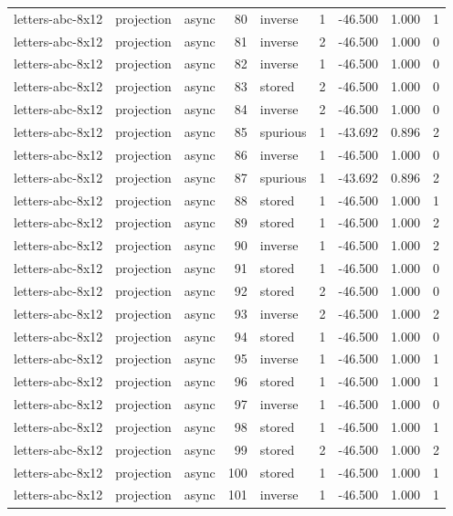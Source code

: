 \begin{tabular}{lllrlrrrr}
letters-abc-8x12 & projection & async & 80 & inverse & 1 & -46.500 & 1.000 & 1 \\
letters-abc-8x12 & projection & async & 81 & inverse & 2 & -46.500 & 1.000 & 0 \\
letters-abc-8x12 & projection & async & 82 & inverse & 1 & -46.500 & 1.000 & 0 \\
letters-abc-8x12 & projection & async & 83 & stored & 2 & -46.500 & 1.000 & 0 \\
letters-abc-8x12 & projection & async & 84 & inverse & 2 & -46.500 & 1.000 & 0 \\
letters-abc-8x12 & projection & async & 85 & spurious & 1 & -43.692 & 0.896 & 2 \\
letters-abc-8x12 & projection & async & 86 & inverse & 1 & -46.500 & 1.000 & 0 \\
letters-abc-8x12 & projection & async & 87 & spurious & 1 & -43.692 & 0.896 & 2 \\
letters-abc-8x12 & projection & async & 88 & stored & 1 & -46.500 & 1.000 & 1 \\
letters-abc-8x12 & projection & async & 89 & stored & 1 & -46.500 & 1.000 & 2 \\
letters-abc-8x12 & projection & async & 90 & inverse & 1 & -46.500 & 1.000 & 2 \\
letters-abc-8x12 & projection & async & 91 & stored & 1 & -46.500 & 1.000 & 0 \\
letters-abc-8x12 & projection & async & 92 & stored & 2 & -46.500 & 1.000 & 0 \\
letters-abc-8x12 & projection & async & 93 & inverse & 2 & -46.500 & 1.000 & 2 \\
letters-abc-8x12 & projection & async & 94 & stored & 1 & -46.500 & 1.000 & 0 \\
letters-abc-8x12 & projection & async & 95 & inverse & 1 & -46.500 & 1.000 & 1 \\
letters-abc-8x12 & projection & async & 96 & stored & 1 & -46.500 & 1.000 & 1 \\
letters-abc-8x12 & projection & async & 97 & inverse & 1 & -46.500 & 1.000 & 0 \\
letters-abc-8x12 & projection & async & 98 & stored & 1 & -46.500 & 1.000 & 1 \\
letters-abc-8x12 & projection & async & 99 & stored & 2 & -46.500 & 1.000 & 2 \\
letters-abc-8x12 & projection & async & 100 & stored & 1 & -46.500 & 1.000 & 1 \\
letters-abc-8x12 & projection & async & 101 & inverse & 1 & -46.500 & 1.000 & 1 \\

\end{tabular}
